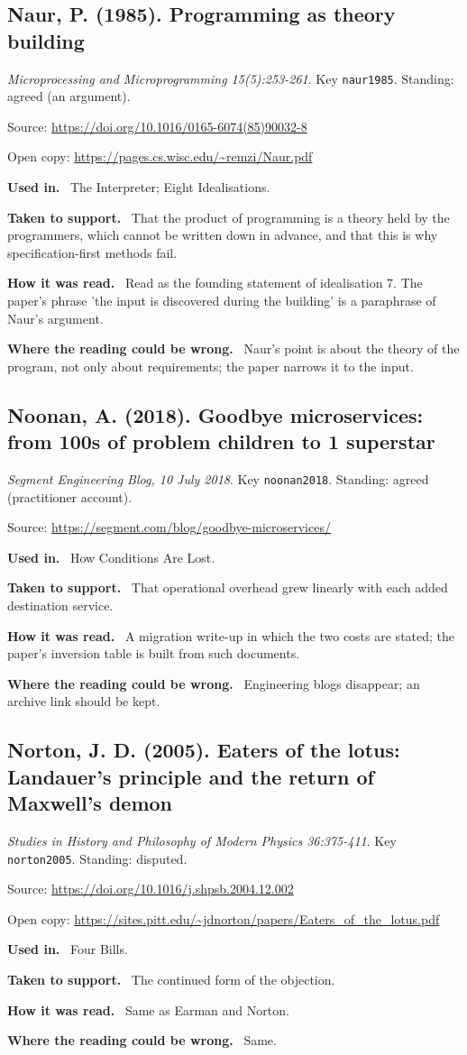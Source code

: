 \documentclass[11pt,oneside]{article}
\newcommand{\field}[1]{\par\noindent\textbf{\color{accent}#1.}\ }
\begin{document}
\subsection*{Naur, P. (1985). Programming as theory building}
\noindent\small\emph{Microprocessing and Microprogramming 15(5):253-261}. Key \texttt{naur1985}. Standing: agreed (an argument).
\par\noindent\small Source: \url{https://doi.org/10.1016/0165-6074(85)90032-8}
\par\noindent\small Open copy: \url{https://pages.cs.wisc.edu/~remzi/Naur.pdf}
\normalsize
\field{Used in} The Interpreter; Eight Idealisations.
\field{Taken to support} That the product of programming is a theory held by the programmers, which cannot be written down in advance, and that this is why specification-first methods fail.
\field{How it was read} Read as the founding statement of idealisation 7. The paper's phrase 'the input is discovered during the building' is a paraphrase of Naur's argument.
\field{Where the reading could be wrong} Naur's point is about the theory of the program, not only about requirements; the paper narrows it to the input.

\hypertarget{src:noonan2018}{}
\subsection*{Noonan, A. (2018). Goodbye microservices: from 100s of problem children to 1 superstar}
\noindent\small\emph{Segment Engineering Blog, 10 July 2018}. Key \texttt{noonan2018}. Standing: agreed (practitioner account).
\par\noindent\small Source: \url{https://segment.com/blog/goodbye-microservices/}
\normalsize
\field{Used in} How Conditions Are Lost.
\field{Taken to support} That operational overhead grew linearly with each added destination service.
\field{How it was read} A migration write-up in which the two costs are stated; the paper's inversion table is built from such documents.
\field{Where the reading could be wrong} Engineering blogs disappear; an archive link should be kept.

\hypertarget{src:norton2005}{}
\subsection*{Norton, J. D. (2005). Eaters of the lotus: Landauer's principle and the return of Maxwell's demon}
\noindent\small\emph{Studies in History and Philosophy of Modern Physics 36:375-411}. Key \texttt{norton2005}. Standing: disputed.
\par\noindent\small Source: \url{https://doi.org/10.1016/j.shpsb.2004.12.002}
\par\noindent\small Open copy: \url{https://sites.pitt.edu/~jdnorton/papers/Eaters_of_the_lotus.pdf}
\normalsize
\field{Used in} Four Bills.
\field{Taken to support} The continued form of the objection.
\field{How it was read} Same as Earman and Norton.
\field{Where the reading could be wrong} Same.
\end{document}
